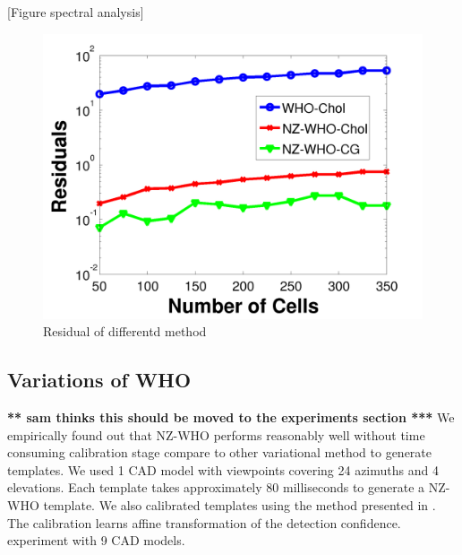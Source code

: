 \documentclass[10pt,twocolumn,letterpaper]{article}
\newcommand{\scream}[1]{{\color{red} \bf *** #1 ***}}
\begin{document}
[Figure spectral analysis]

\begin{figure}[t]
  \centering
  \includegraphics[width=0.5\linewidth]{residual}
  \caption{Residual of differentd method}
  \label{fig:whotime}
\end{figure}

\subsection{Variations of WHO}
\scream{sam thinks this should be moved to the experiments section}
We empirically found out that NZ-WHO performs reasonably well without time
consuming calibration stage compare to other variational method to generate
templates. We used 1 CAD model with viewpoints covering 24 azimuths and 4
elevations. Each template takes approximately 80 milliseconds to generate a
NZ-WHO template. We also calibrated templates using the method presented in
\cite{Aubry14}. The calibration learns affine transformation of the detection
confidence.%
experiment with 9 CAD models.
\end{document}
